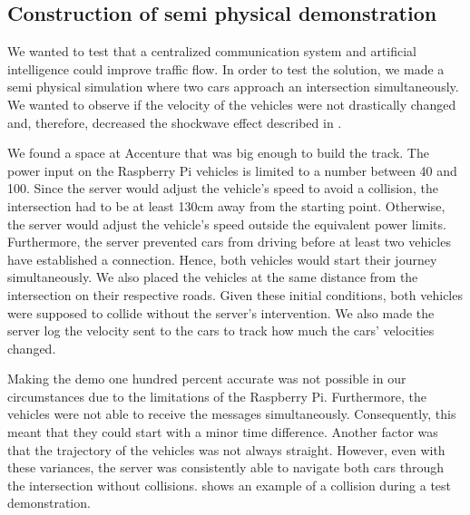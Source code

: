 \subsection{Construction of semi physical demonstration}\label{sec:demo}
We wanted to test that a centralized communication system and artificial intelligence could improve traffic flow. In order to test the solution, we made a semi physical simulation where two cars approach an intersection simultaneously. We wanted to observe if the velocity of the vehicles were not drastically changed and, therefore, decreased the shockwave effect described in .

We found a space at Accenture that was big enough to build the track. The power input on the Raspberry Pi vehicles is limited to a number between 40 and 100.  Since the server would adjust the vehicle's speed to avoid a collision, the intersection had to be at least 130cm away from the starting point. Otherwise, the server would adjust the vehicle's speed outside the equivalent power limits. Furthermore, the server prevented cars from driving before at least two vehicles have established a connection. Hence, both vehicles would start their journey simultaneously. We also placed the vehicles at the same distance from the intersection on their respective roads. Given these initial conditions, both vehicles were supposed to collide without the server's intervention. We also made the server log the velocity sent to the cars to track how much the cars' velocities changed.

Making the demo one hundred percent accurate was not possible in our circumstances due to the limitations of the Raspberry Pi. Furthermore, the vehicles were not able to receive the messages simultaneously. Consequently, this meant that they could start with a minor time difference. Another factor was that the trajectory of the vehicles was not always straight. However, even with these variances, the server was consistently able to navigate both cars through the intersection without collisions.  shows an example of a collision during a test demonstration.

